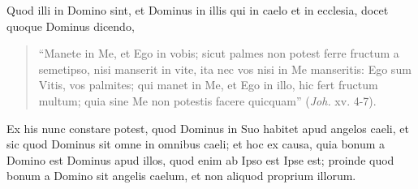 \begin{topic}{11}
    Quod illi in Domino sint, et Dominus in illis qui in caelo et in ecclesia, docet quoque Dominus dicendo,
    \begin{quote}
        ``Manete in Me, et Ego in vobis; sicut palmes non potest ferre fructum a semetipso, nisi manserit in vite, ita
        nec vos nisi in Me manseritis: Ego sum Vitis, vos palmites; qui manet in Me, et Ego in illo, hic fert fructum
        multum; quia sine Me non potestis facere quicquam'' (\emph{Joh.} xv. 4-7).
    \end{quote}
\end{topic}

\begin{topic}{12}
    Ex his nunc constare potest, quod Dominus in Suo habitet apud angelos caeli, et sic quod Dominus sit omne in omnibus
    caeli; et hoc ex causa, quia bonum a Domino est Dominus apud illos, quod enim ab Ipso est Ipse est; proinde quod
    bonum a Domino sit angelis caelum, et non aliquod proprium illorum.
\end{topic}
